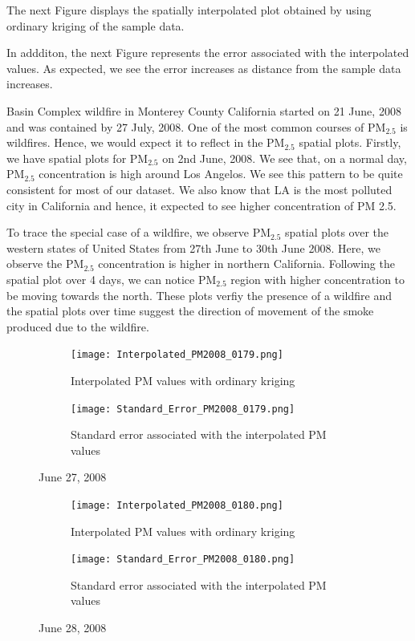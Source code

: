 \documentclass[10pt]{article}
\begin{document}
The next Figure displays the spatially interpolated plot obtained by using ordinary kriging of the sample data.


In addditon, the next Figure represents the error associated with the interpolated values. As expected, we see the error increases as distance from the sample data increases. 



Basin Complex wildfire in Monterey County California started on 21 June, 2008 and was contained by 27 July, 2008. One of the most common courses of PM$_{2.5}$ is wildfires. Hence, we would expect it to reflect in the PM$_{2.5}$ spatial plots. Firstly, we have spatial plots for PM$_{2.5}$ on 2nd June, 2008. We see that, on a normal day, PM$_{2.5}$ concentration is high around Los Angelos. We see this pattern to be quite consistent for most of our dataset. We also know that LA is the most polluted city in California and hence, it expected to see higher concentration of PM 2.5. 



To trace the special case of a wildfire, we observe PM$_{2.5}$ spatial plots over the western states of United States from 27th June to 30th June 2008. Here, we observe the PM$_{2.5}$ concentration is higher in northern California. Following the spatial plot over 4 days, we  can notice PM$_{2.5}$ region  with higher concentration to be moving towards the north. These plots verfiy the presence of a wildfire and the  spatial plots over time suggest the direction of movement of the smoke produced due to the wildfire. 

\begin{figure}[H]
\centering
\begin{subfigure}{.5\textwidth}
  \centering
  \texttt{[image: Interpolated\_PM2008\_0179.png]}
  \caption{ Interpolated PM values with ordinary kriging}
\end{subfigure}%
\begin{subfigure}{.5\textwidth}
  \centering
  \texttt{[image: Standard\_Error\_PM2008\_0179.png]}
  \caption{Standard error associated with the interpolated PM values}
\end{subfigure}
\caption{June 27, 2008}
\label{f}
\end{figure}

\begin{figure}[H]
\centering
\begin{subfigure}{.5\textwidth}
  \centering
  \texttt{[image: Interpolated\_PM2008\_0180.png]}
  \caption{ Interpolated PM values with ordinary kriging}
\end{subfigure}%
\begin{subfigure}{.5\textwidth}
  \centering
  \texttt{[image: Standard\_Error\_PM2008\_0180.png]}
  \caption{Standard error associated with the interpolated PM values}
\end{subfigure}
\caption{June 28, 2008}
\label{f}
\end{figure}
\end{document}
